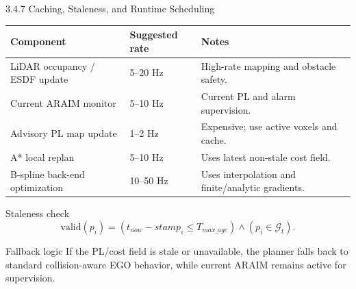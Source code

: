 \documentclass[10pt,aspectratio=169,xcolor=dvipsnames]{beamer}
\newcommand{\Ggrid}{\mathcal{G}}
\begin{document}
\begin{frame}{3.4.7 Caching, Staleness, and Runtime Scheduling}
  \small
  \begin{table}\scriptsize
    \begin{tabular}{p{} p{} p{}}
      \toprule
      \textbf{Component} & \textbf{Suggested rate} & \textbf{Notes}\\
      \midrule
      LiDAR occupancy / ESDF update & 5--20 Hz & High-rate mapping and obstacle safety.\\
      Current ARAIM monitor & 5--10 Hz & Current PL and alarm supervision.\\
      Advisory PL map update & 1--2 Hz & Expensive; use active voxels and cache.\\
      A* local replan & 5--10 Hz & Uses latest non-stale cost field.\\
      B-spline back-end optimization & 10--50 Hz & Uses interpolation and finite/analytic gradients.\\
      \bottomrule
    \end{tabular}
  \end{table}

  \begin{block}{Staleness check}
    \vspace{-4pt}
    \[
      \text{valid}(p_i)=\left(t_{now}-stamp_i\le T_{max\_age}\right)\land\left(p_i\in\Ggrid_t\right).
    \]
  \end{block}

  \begin{alertblock}{Fallback logic}
    \footnotesize If the PL/cost field is stale or unavailable, the planner falls back to standard collision-aware EGO behavior, while current ARAIM remains active for supervision.
  \end{alertblock}
\end{frame}
\end{document}
